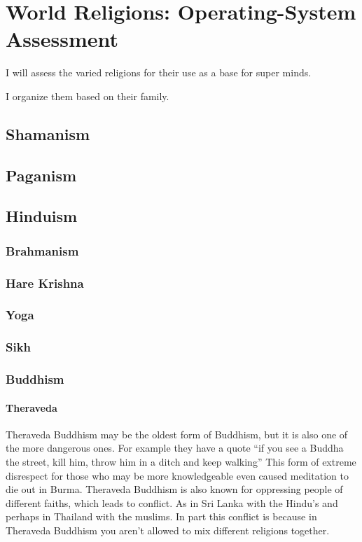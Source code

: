 \part{World Religions: Operating-System Assessment}\label{worldreligions}

I will assess the varied religions for their use as a base for super minds.

I organize them based on their family.  

\chapter{Shamanism}
\chapter{Paganism}
\chapter{Hinduism}
\section{Brahmanism}
\section{Hare Krishna}
\section{Yoga}
\section{Sikh}
\section{Buddhism}\label{Buddhism}
\subsection{Theraveda}
Theraveda Buddhism may be the oldest form of Buddhism, but it is also one of the 
more dangerous ones.
For example they have a quote ``if you see a Buddha the street, kill him,
throw him in a ditch and keep walking''
This form of extreme disrespect for those who may be more knowledgeable even
caused meditation to die out in Burma.
Theraveda Buddhism is also known for oppressing people of different faiths,
which leads to conflict. As in Sri Lanka with the Hindu's and perhaps in
Thailand with the muslims. 
In part this conflict is because in Theraveda Buddhism you aren't allowed to mix
different religions together. 
